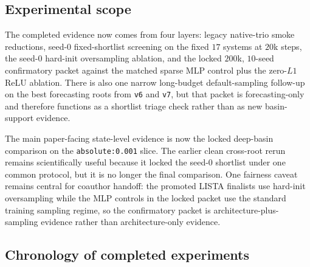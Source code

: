 \documentclass[11pt]{article}
\begin{document}
\subsection{Experimental scope}

The completed evidence now comes from four layers: legacy native-trio smoke
reductions, seed-$0$ fixed-shortlist screening on the fixed $17$ systems at
$20$k steps, the seed-$0$ hard-init oversampling ablation, and the locked
$200$k, $10$-seed confirmatory packet against the matched sparse MLP control
plus the zero-$L1$ ReLU ablation. There is also one narrow long-budget
default-sampling follow-up on the best forecasting roots from \texttt{v6} and
\texttt{v7}, but that packet is forecasting-only and therefore functions as a
shortlist triage check rather than as new basin-support evidence.

The main paper-facing state-level evidence is now the locked deep-basin
comparison on the \texttt{absolute:0.001} slice. The earlier clean cross-root
rerun remains scientifically useful because it locked the seed-$0$ shortlist
under one common protocol, but it is no longer the final comparison. One
fairness caveat remains central for coauthor handoff: the promoted LISTA
finalists use hard-init oversampling while the MLP controls in the locked
packet use the standard training sampling regime, so the confirmatory packet is
architecture-plus-sampling evidence rather than architecture-only evidence.

\subsection{Chronology of completed experiments}
\end{document}
